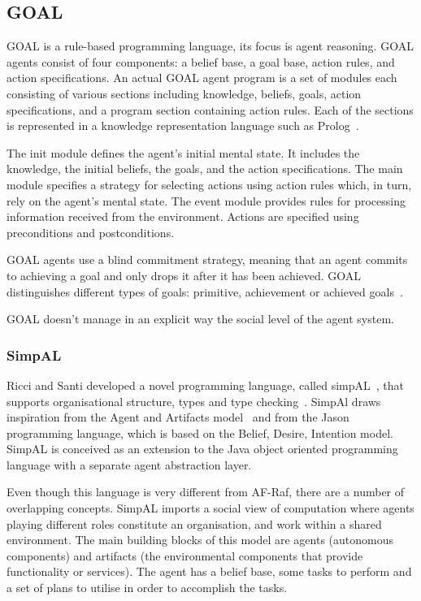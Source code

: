 \documentclass[a4paper,12pt,oneside,fleqn]{book} %
\begin{document}
\subsection{GOAL} %
GOAL is a rule-based programming language, its focus is agent reasoning.
GOAL agents consist of four components: a belief base, a goal base, action
rules, and action specifications. An actual GOAL agent program is a set of
modules each consisting of various sections including knowledge, beliefs,
goals, action specifications, and a program section containing action
rules. Each of the sections is represented in a knowledge representation
language such as Prolog~\cite{DBLP:books/daglib/0076175}.

The init module defines the agent's initial mental state. It includes the
knowledge, the initial beliefs, the goals, and the action specifications.
The main module specifies a strategy for selecting actions using action
rules which, in turn, rely on the agent's mental state. The event module
provides rules for processing information received from the environment.
Actions are specified using preconditions and postconditions.

GOAL agents use a blind commitment strategy, meaning that an agent commits
to achieving a goal and only drops it after it has been achieved. GOAL
distinguishes different types of goals: primitive, achievement or achieved
goals~\cite{DBLP:conf/jelia/indriksH08}.

GOAL doesn't manage in an explicit way the social level of the agent system.

\subsubsection{SimpAL} %
Ricci  and Santi developed a novel programming language, called
simpAL~\cite{DBLP:conf/oopsla/RicciS11,DBLP:conf/oopsla/RicciS12}, that
supports organisational structure, types and type
checking~\cite{DBLP:conf/promas/RicciS12}. SimpAl draws inspiration from
the Agent and Artifacts model~\cite{DBLP:conf/atal/RicciVO07} and from the
Jason programming language, which is based on the Belief, Desire, Intention
model. SimpAL is conceived as an extension to the Java object oriented
programming language with a separate agent abstraction layer.

Even though this language is very different from AF-Raf, there are a number
of overlapping concepts. SimpAL imports a social view of computation where
agents playing different roles constitute an organisation, and work within
a shared environment. The main building blocks of this model are agents
(autonomous components) and artifacts (the environmental components that
provide functionality or services). The agent has a belief base, some tasks
to perform and a set of plans to utilise in order to accomplish the tasks.
\end{document}
